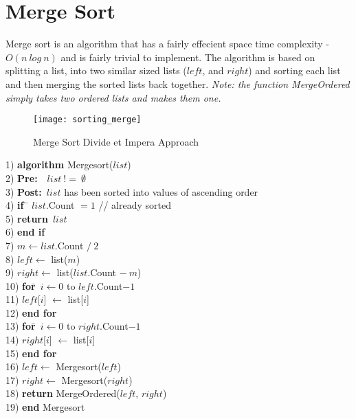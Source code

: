 \section{Merge Sort}
Merge sort is an algorithm that has a fairly effecient space time complexity - $O(n~log~n)$ and is fairly trivial to implement. The algorithm is based on splitting a list, into two similar sized lists ($left$, and $right$) and sorting each list and then merging the sorted lists back together. \textit{Note: the function MergeOrdered simply takes two ordered lists and makes them one.}

\begin{figure}[ht]
\begin{center}
\texttt{[image: sorting\_merge]}
\end{center}
\caption{Merge Sort Divide et Impera Approach} \label{fig:sorting_merge}
\end{figure}

\begin{tabbing}
1)  \textbf{alg}\= \textbf{orithm} Mergesort($list$) \\
2)  \> \textbf{Pre:}~~$list~!=~\emptyset$ \\
3)  \> \textbf{Post:}~$list$ has been sorted into values of ascending order \\
4)  \> \textbf{if}~\= $list$.Count $= 1$ // already sorted \\
5)  \> \> \textbf{return}~$list$ \\
6)  \> \textbf{end if} \\
7)  \> $m \leftarrow list$.Count $/~2$ \\
8)  \> $left \leftarrow$ list($m$) \\
9)  \> $right \leftarrow$ list($list$.Count $-~m$) \\
10) \> \textbf{for}\=~$i \leftarrow 0$ to $left$.Count$-1$ \\
11) \> \> $left$[$i$] $\leftarrow$ list[$i$] \\
12) \> \textbf{end for} \\
13) \> \textbf{for}\=~$i \leftarrow 0$ to $right$.Count$-1$ \\
14) \> \> $right$[$i$] $\leftarrow$ list[$i$] \\
15) \> \textbf{end for} \\
16) \> $left \leftarrow$ Mergesort($left$) \\
17) \> $right \leftarrow$ Mergesort($right$) \\
18) \> \textbf{return} MergeOrdered($left$, $right$) \\
19) \textbf{end} Mergesort \\
\end{tabbing}

